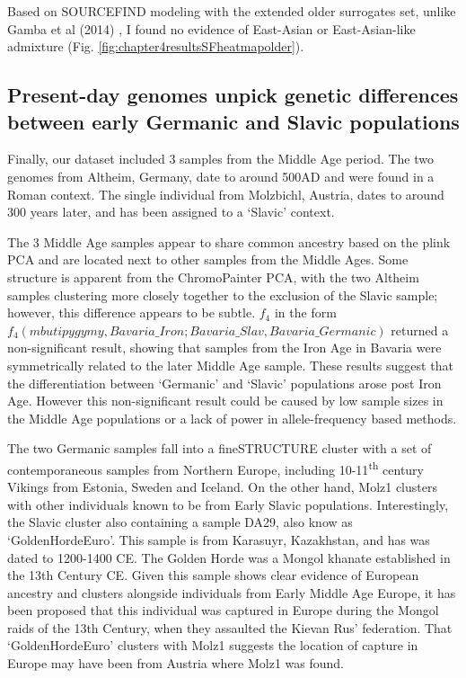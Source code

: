 Based on SOURCEFIND modeling with the extended older surrogates set, unlike Gamba et al (2014) \cite{Gamba2014}, I found no evidence of East-Asian or East-Asian-like admixture (Fig. \ref{fig:chapter4resultsSFheatmapolder}).


\subsection{Present-day genomes unpick genetic differences between early Germanic and Slavic populations}

Finally, our dataset included 3 samples from the Middle Age period. The two genomes from Altheim, Germany, date to around 500AD and were found in a Roman context. The single individual from Molzbichl, Austria, dates to around 300 years later, and has been assigned to a `Slavic' context.  

The 3 Middle Age samples appear to share common ancestry based on the plink PCA and are located next to other samples from the Middle Ages. Some structure is apparent from the ChromoPainter PCA, with the two Altheim samples clustering more closely together to the exclusion of the Slavic sample; however, this difference appears to be subtle. $f_{4}$ in the form $f_{4}(mbutipygymy, Bavaria\_Iron; Bavaria\_Slav, Bavaria\_Germanic)$ returned a non-significant result, showing that samples from the Iron Age in Bavaria were symmetrically related to the later Middle Age sample. These results suggest that the differentiation between `Germanic' and `Slavic' populations arose post Iron Age. However this non-significant result could be caused by low sample sizes in the Middle Age populations or a lack of power in allele-frequency based methods.

The two Germanic samples fall into a fineSTRUCTURE cluster with a set of contemporaneous samples from Northern Europe, including 10-11\textsuperscript{th} century Vikings from Estonia, Sweden and Iceland. On the other hand, Molz1 clusters with other individuals known to be from Early Slavic populations. Interestingly, the Slavic cluster also containing a sample DA29, also know as `GoldenHordeEuro'. This sample is from Karasuyr, Kazakhstan, and has was dated to 1200-1400 CE. The Golden Horde was a Mongol khanate established in the 13th Century CE. Given this sample shows clear evidence of European ancestry and clusters alongside individuals from Early Middle Age Europe, it has been proposed that this individual was captured in Europe during the Mongol raids of the 13th Century, when they assaulted the Kievan Rus' federation. That `GoldenHordeEuro' clusters with Molz1 suggests the location of capture in Europe may have been from Austria where Molz1 was found. 

